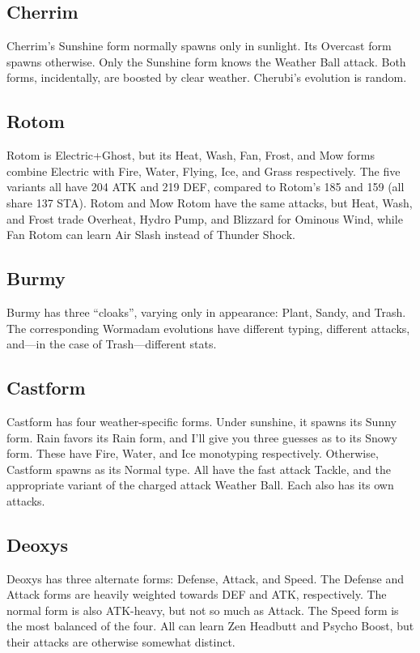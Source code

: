 \subsection{Cherrim}
Cherrim's Sunshine form normally spawns only in sunlight.
Its Overcast form spawns otherwise.
Only the Sunshine form knows the Weather Ball attack.
Both forms, incidentally, are boosted by clear weather.
Cherubi's evolution is random.

\subsection{Rotom}
Rotom is Electric+Ghost, but its Heat, Wash, Fan, Frost, and Mow forms
 combine Electric with Fire, Water, Flying, Ice, and Grass respectively.
The five variants all have 204 ATK and 219 DEF, compared to Rotom's
 185 and 159 (all share 137 STA).
Rotom and Mow Rotom have the same attacks, but Heat, Wash, and Frost
  trade Overheat, Hydro Pump, and Blizzard for Ominous Wind,
  while Fan Rotom can learn Air Slash instead of Thunder Shock.

\subsection{Burmy}
Burmy has three ``cloaks'', varying only in appearance: Plant, Sandy, and Trash.
The corresponding Wormadam evolutions have different typing, different attacks,
 and---in the case of Trash---different stats.

\subsection{Castform\label{subsec:castform}}
Castform has four weather-specific forms.
Under sunshine, it spawns its Sunny form.
Rain favors its Rain form, and I'll give you three guesses as to its Snowy form.
These have Fire, Water, and Ice monotyping respectively.
Otherwise, Castform spawns as its Normal type.
All have the fast attack Tackle, and the appropriate variant of the charged attack Weather Ball.
Each also has its own attacks.

\subsection{Deoxys\label{subsec:deoxys}}
Deoxys has three alternate forms: Defense, Attack, and Speed.
The Defense and Attack forms are heavily weighted towards DEF and ATK, respectively.
The normal form is also ATK-heavy, but not so much as Attack.
The Speed form is the most balanced of the four.
All can learn Zen Headbutt and Psycho Boost, but their attacks are otherwise somewhat distinct.

